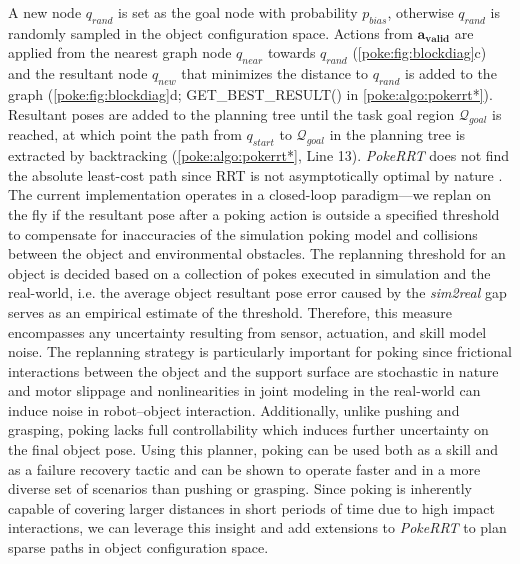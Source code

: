 A new node $q_{rand}$ is set as the goal node with probability $p_{bias}$, otherwise $q_{rand}$ is randomly sampled in the object configuration space. Actions from $\boldsymbol{a_{valid}}$ are applied from the nearest graph node $q_{near}$ towards $q_{rand}$ (\cref{poke:fig:blockdiag}c) and the resultant node $q_{new}$ that minimizes the distance to $q_{rand}$ is added to the graph (\cref{poke:fig:blockdiag}d; GET\_BEST\_RESULT() in \cref{poke:algo:pokerrt*}).
Resultant poses are added to the planning tree until the task goal region $\mathcal{Q}_{goal}$ is reached, at which point the path from $q_{start}$ to $\mathcal{Q}_{goal}$ in the planning tree is extracted by backtracking (\cref{poke:algo:pokerrt*}, Line 13). \textsl{PokeRRT} does not find the absolute least-cost path since RRT is not asymptotically optimal by nature \cite{lavalle1998rapidly}. The current implementation operates in a closed-loop paradigm---we replan on the fly if the resultant pose after a poking action is outside a specified threshold to compensate for inaccuracies of the simulation poking model and collisions between the object and environmental obstacles. The replanning threshold for an object is decided based on a collection of pokes executed in simulation and the real-world, i.e. the average object resultant pose error caused by the \textsl{sim2real} gap serves as an empirical estimate of the threshold. Therefore, this measure encompasses any uncertainty resulting from sensor, actuation, and skill model noise. The replanning strategy is particularly important for poking since frictional interactions between the object and the support surface are stochastic in nature and motor slippage and nonlinearities in joint modeling in the real-world can induce noise in robot--object interaction. Additionally, unlike pushing and grasping, poking lacks full controllability which induces further uncertainty on the final object pose.
Using this planner, poking can be used both as a skill and as a failure recovery tactic and can be shown to operate faster and in a more diverse set of scenarios than pushing or grasping.
Since poking is inherently capable of covering larger distances in short periods of time due to high impact interactions, we can leverage this insight and add extensions to \textsl{PokeRRT} to plan sparse paths in object configuration space.

